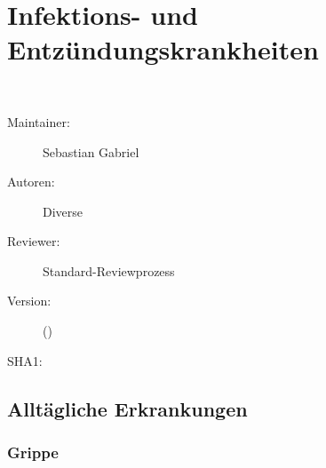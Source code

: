 \def\ChapterCode{INK}
\chapter
[\CO{[INK]} Infektions- und Entzündungskrankheiten]
{Infektions- und Entzündungskrankheiten}
\label{chp:INK}

\ChapterIntro
{%
~~~
}
{%
\begin{description}
  \item[Maintainer:] Sebastian Gabriel
  \item[Autoren:] Diverse
  \item[Reviewer:] Standard-Reviewprozess
  \item[Version:] {\DocVersion} ({\DocVersionInfo})
  \item[SHA1:] {\DocGitCommit}
\end{description}

{\TxTeilkapitelAASS}
}

\clearpage

\section{Alltägliche Erkrankungen}


\subsection{Grippe}
\label{topic:grippe}
\label{topic:influenza}




